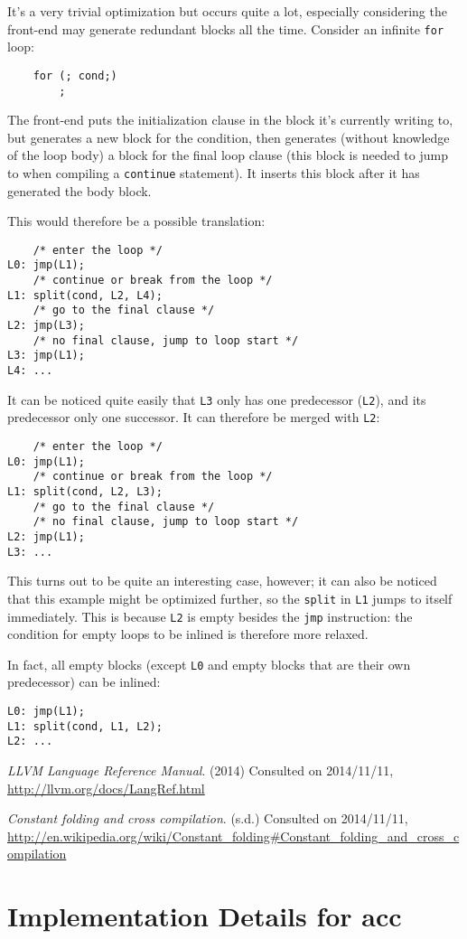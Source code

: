 \documentclass[12pt, a4paper]{article}
\begin{document}
It's a very trivial optimization but occurs quite a lot, especially considering
the front-end may generate redundant blocks all the time. Consider an infinite
\verb+for+ loop:

\begin{lstlisting}
	for (; cond;)
		;
\end{lstlisting}

The front-end puts the initialization clause in the block it's currently writing
to, but generates a new block for the condition, then generates (without knowledge
of the loop body) a block for the final loop clause (this block is needed to jump
to when compiling a \verb+continue+ statement). It inserts this block after
it has generated the body block.

This would therefore be a possible translation:

\begin{lstlisting}
	/* enter the loop */
L0:	jmp(L1);
	/* continue or break from the loop */
L1:	split(cond, L2, L4);
	/* go to the final clause */
L2:	jmp(L3);
	/* no final clause, jump to loop start */
L3:	jmp(L1);
L4:	...
\end{lstlisting}

It can be noticed quite easily that \verb+L3+ only has one predecessor (\verb+L2+), and its
predecessor only one successor. It can therefore be merged with \verb+L2+:

\begin{lstlisting}
	/* enter the loop */
L0:	jmp(L1);
	/* continue or break from the loop */
L1:	split(cond, L2, L3);
	/* go to the final clause */
	/* no final clause, jump to loop start */
L2:	jmp(L1);
L3:	...
\end{lstlisting}

This turns out to be quite an interesting case, however; it can also be noticed
that this example might be optimized further, so the \verb+split+ in \verb+L1+
jumps to itself immediately. This is because \verb+L2+ is empty besides the \verb+jmp+
instruction: the condition for empty loops to be inlined is therefore more relaxed.

In fact, all empty blocks (except \verb+L0+ and empty blocks that are their own predecessor) can be inlined:

\begin{lstlisting}
L0:	jmp(L1);
L1:	split(cond, L1, L2);
L2:	...
\end{lstlisting}

\begin{thebibliography}{9}
  \emph{LLVM Language Reference Manual}. (2014) Consulted on 2014/11/11,
  \url{http://llvm.org/docs/LangRef.html}

  \emph{Constant folding and cross compilation}. (s.d.) Consulted on 2014/11/11,
  \url{http://en.wikipedia.org/wiki/Constant_folding#Constant_folding_and_cross_compilation}
\end{thebibliography}


\newpage
\appendix
\section{Implementation Details for acc}
\end{document}
